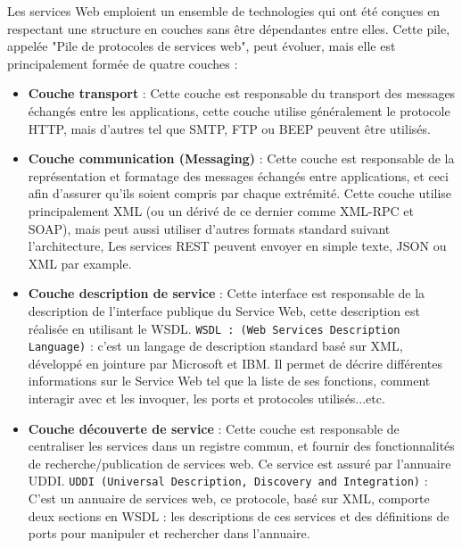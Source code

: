 Les services Web emploient un ensemble de technologies qui ont été conçues en respectant une structure en couches sans être dépendantes entre elles. Cette pile, appelée "Pile de protocoles de services web", peut évoluer, mais elle est principalement formée de quatre couches : \cite{refTutorialPointsWS}
			\begin{itemize}
			\item \textbf{Couche transport} : Cette couche est responsable du transport des messages échangés entre les applications, cette couche utilise généralement le protocole HTTP, mais d'autres tel que SMTP, FTP ou BEEP peuvent être utilisés.
			\item \textbf{Couche communication (Messaging)} : Cette couche est responsable de la représentation et formatage des messages échangés entre applications, et ceci afin d'assurer qu'ils soient compris par chaque extrémité. Cette couche utilise principalement XML (ou un dérivé de ce dernier comme XML-RPC et SOAP), mais peut aussi utiliser d'autres formats standard suivant l'architecture, Les services REST peuvent envoyer en simple texte, JSON ou XML par example.
			\item \textbf{Couche description de service} : Cette interface est responsable de la description de l'interface publique du Service Web, cette description est réalisée en utilisant le WSDL.\newline
			\texttt{WSDL : (Web Services Description Language)} : c'est un langage de description standard basé sur XML, développé en jointure par Microsoft et IBM. Il permet de décrire différentes informations sur le Service Web tel que la liste de ses fonctions, comment interagir avec et les invoquer, les ports et protocoles utilisés...etc.
			\item \textbf{Couche découverte de service} : Cette couche est responsable de centraliser les services dans un registre commun, et fournir des fonctionnalités de recherche/publication de services web. Ce service est assuré par l'annuaire UDDI.\newline
			\texttt{UDDI (Universal Description, Discovery and Integration)} : C'est un annuaire de services web, ce protocole, basé sur XML, comporte deux sections en WSDL : les descriptions de ces services et des définitions de ports pour manipuler et rechercher dans l'annuaire.
			\end{itemize}
			
